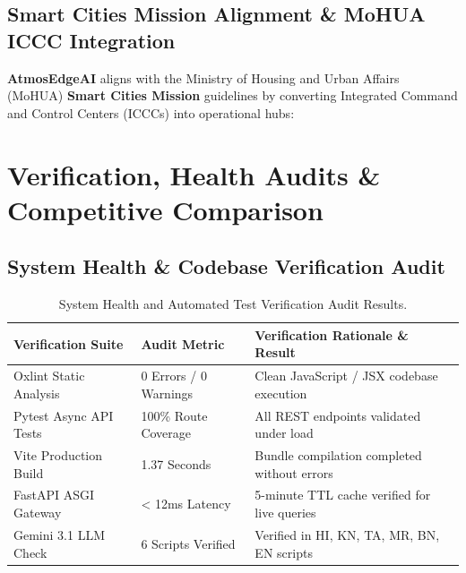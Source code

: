\documentclass[11pt, a4paper]{article}
\newcommand{\atmosedge}{\textbf{\textcolor{mainblue}{AtmosEdgeAI}}}
\begin{document}
\subsection{Smart Cities Mission Alignment \& MoHUA ICCC Integration}
\atmosedge{} aligns with the Ministry of Housing and Urban Affairs (MoHUA) \textbf{Smart Cities Mission} guidelines by converting Integrated Command and Control Centers (ICCCs) into operational hubs:

\begin{center}
\end{center}

\section{Verification, Health Audits \& Competitive Comparison}

\subsection{System Health \& Codebase Verification Audit}

\begin{table}[H]
\centering
\small
{}
\begin{tabularx}{\textwidth}{L{4.4cm} L{3.4cm} Y}
\toprule
{}
\textbf{Verification Suite} & \textbf{Audit Metric} & \textbf{Verification Rationale \& Result} \\
\midrule
Oxlint Static Analysis & 0 Errors / 0 Warnings & Clean JavaScript / JSX codebase execution \\
Pytest Async API Tests & 100\% Route Coverage & All REST endpoints validated under load \\
Vite Production Build & 1.37 Seconds & Bundle compilation completed without errors \\
FastAPI ASGI Gateway & < 12ms Latency & 5-minute TTL cache verified for live queries \\
Gemini 3.1 LLM Check & 6 Scripts Verified & Verified in HI, KN, TA, MR, BN, EN scripts \\
\bottomrule
\end{tabularx}
\caption{System Health and Automated Test Verification Audit Results.}
\end{table}
\end{document}
